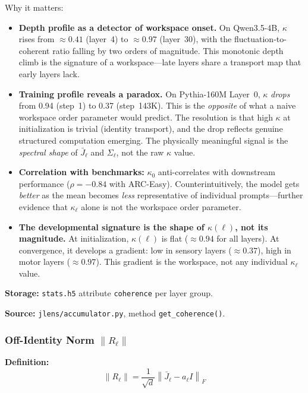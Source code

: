 \documentclass[11pt,a4paper]{article}
\begin{document}
Why it matters:
\begin{itemize}
  \item \textbf{Depth profile as a detector of workspace onset.} On Qwen3.5-4B, $\kappa$ rises from $\approx 0.41$ (layer~4) to $\approx 0.97$ (layer~30), with the fluctuation-to-coherent ratio falling by two orders of magnitude. This monotonic depth climb is the signature of a workspace---late layers share a transport map that early layers lack.
  \item \textbf{Training profile reveals a paradox.} On Pythia-160M Layer~0, $\kappa$ \emph{drops} from 0.94 (step~1) to 0.37 (step~143K). This is the \emph{opposite} of what a naive workspace order parameter would predict. The resolution is that high $\kappa$ at initialization is trivial (identity transport), and the drop reflects genuine structured computation emerging. The physically meaningful signal is the \emph{spectral shape} of $\bar{J}_\ell$ and $\Sigma_\ell$, not the raw $\kappa$ value.
  \item \textbf{Correlation with benchmarks:} $\kappa_0$ anti-correlates with downstream performance ($\rho = -0.84$ with ARC-Easy). Counterintuitively, the model gets \emph{better} as the mean becomes \emph{less} representative of individual prompts---further evidence that $\kappa_\ell$ alone is not the workspace order parameter.
  \item \textbf{The developmental signature is the shape of $\kappa(\ell)$, not its magnitude.} At initialization, $\kappa(\ell)$ is flat ($\approx 0.94$ for all layers). At convergence, it develops a gradient: low in sensory layers ($\approx 0.37$), high in motor layers ($\approx 0.97$). This gradient is the workspace, not any individual $\kappa_\ell$ value.
\end{itemize}

\textbf{Storage:} \texttt{stats.h5} attribute \texttt{coherence} per layer group.

\textbf{Source:} \texttt{jlens/accumulator.py}, method \texttt{get\_coherence()}.

\subsubsection{Off-Identity Norm $\|R_\ell\|$}
\label{sec:r_norm}

\textbf{Definition:}
\begin{equation}
  \|R_\ell\| = \frac{1}{\sqrt{d}}\left\|\bar{J}_\ell - a_\ell I\right\|_F
\end{equation}
\end{document}
